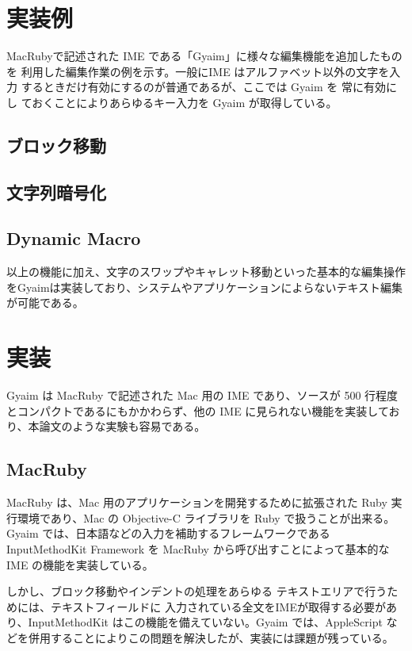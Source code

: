 \documentclass[twoside]{wiss}
\begin{document}
\section{実装例}

MacRubyで記述された IME である「Gyaim」に様々な編集機能を追加したものを
利用した編集作業の例を示す。一般にIME はアルファベット以外の文字を入力
するときだけ有効にするのが普通であるが、ここでは Gyaim を 常に有効にし
ておくことによりあらゆるキー入力を Gyaim が取得している。

\subsection{ブロック移動}

\subsection{文字列暗号化}
\subsection{Dynamic Macro}

以上の機能に加え、文字のスワップやキャレット移動といった基本的な編集操作をGyaimは実装しており、システムやアプリケーションによらないテキスト編集が可能である。

\section{実装}
Gyaim は MacRuby で記述された Mac 用の IME であり、ソースが 500 行程度とコンパクトであるにもかかわらず、他の IME に見られない機能を実装しており、本論文のような実験も容易である。

\subsection{MacRuby}
MacRuby は、Mac 用のアプリケーションを開発するために拡張された Ruby 実行環境であり、Mac の Objective-C ライブラリを Ruby で扱うことが出来る。
Gyaim では、日本語などの入力を補助するフレームワークである InputMethodKit Framework を MacRuby から呼び出すことによって基本的な IME の機能を実装している。

しかし、ブロック移動やインデントの処理をあらゆる テキストエリアで行うためには、テキストフィールドに 入力されている全文をIMEが取得する必要があり、InputMethodKit はこの機能を備えていない。Gyaim では、AppleScript などを併用することによりこの問題を解決したが、実装には課題が残っている。
\end{document}
